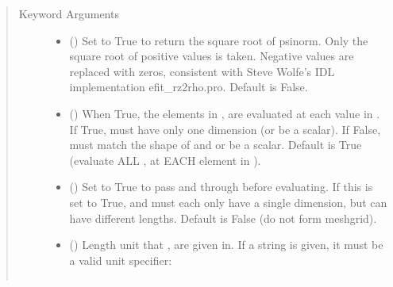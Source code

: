 \documentclass[letterpaper,10pt,english]{sphinxmanual}
\begin{document}
\begin{fulllineitems}
\begin{fulllineitems}
\begin{quote}
\begin{description}
\begin{itemize}
\end{itemize}

\item[{Keyword Arguments}] \leavevmode\begin{itemize}
\item {} 
 () \textendash{} Set to True to return the square root of psinorm.
Only the square root of positive values is taken. Negative
values are replaced with zeros, consistent with Steve Wolfe’s
IDL implementation efit\_rz2rho.pro. Default is False.

\item {} 
 () \textendash{} When True, the elements in ,  are evaluated
at each value in . If True,  must have only one dimension
(or be a scalar). If False,  must match the shape of  and
 or be a scalar. Default is True (evaluate ALL ,  at
EACH element in ).

\item {} 
 () \textendash{} Set to True to pass  and  through
 before evaluating. If this is set to
True,  and  must each only have a single dimension, but
can have different lengths. Default is False (do not form
meshgrid).

\item {} 
 () \textendash{} 
Length unit that ,  are given in.
If a string is given, it must be a valid unit specifier:
\begin{quote}


\begin{savenotes}\sphinxattablestart
\centering
\begin{tabulary}{\linewidth}[t]{|T|T|}
\hline


\end{tabulary}
\end{savenotes}
\end{quote}
\end{itemize}
\end{description}
\end{quote}
\end{fulllineitems}
\end{fulllineitems}
\end{document}
